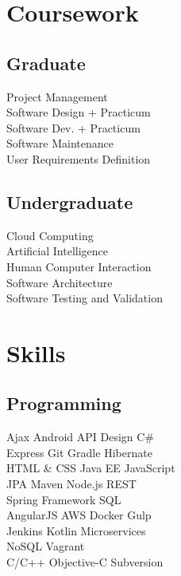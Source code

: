 \documentclass[]{resume}
\begin{document}
\begin{minipage}[t]{0.33\textwidth}
\section{Coursework}
\subsection{Graduate}
Project Management \\
Software Design + Practicum \\
Software Dev. + Practicum \\
Software Maintenance \\
User Requirements Definition \\
\sectionsep

\subsection{Undergraduate}
Cloud Computing \\
Artificial Intelligence \\
Human Computer Interaction \\
Software Architecture \\
Software Testing and Validation \\
\sectionsep


\section{Skills}
\subsection{Programming}
Ajax \textbullet{} Android \textbullet{} API Design \textbullet{} C\# \\
Express \textbullet{} Git \textbullet{} Gradle \textbullet{} Hibernate \\
HTML \& CSS \textbullet{} Java EE \textbullet{} JavaScript \\
JPA \textbullet{} Maven \textbullet{} Node.js \textbullet{} REST \\ 
Spring Framework\textbullet{} SQL \\
AngularJS \textbullet{} AWS \textbullet{} Docker \textbullet{} Gulp \\
Jenkins \textbullet{} Kotlin \textbullet{} Microservices \\
NoSQL \textbullet{} Vagrant\\
C/C++ \textbullet{} Objective-C \textbullet{} Subversion \\ 
\sectionsep

%
%

\end{minipage} 
\end{document}
